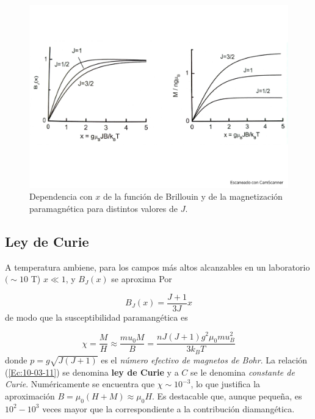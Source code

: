 \begin{figure}[h!] \centering
	\includegraphics[scale=0.35]{Cuerpo/Ch_10/Fotos libro 2.pdf}
	\caption{Dependencia con $x$ de la función de Brillouin y de la magnetización paramagnética para distintos valores de $J$.}
	\label{Fig:10-02}
\end{figure}

\subsection{Ley de Curie}

A temperatura ambiene, para los campos más altos alcanzables en un laboratorio $(\sim 10$ T) $x\ll 1$, y $B_J(x)$ se aproxima Por

\begin{equation}
	B_J (x) = \frac{J+1}{3J} x
\end{equation}
de modo que la susceptibilidad paramangética es 

\begin{equation}
	\chi = \frac{M}{H} \approx \frac{mu_0 M}{B} = \frac{nJ(J+1)g^2 \mu_0 mu_B^2}{3k_BT} \label{Ec:10-03-11}
\end{equation}
donde $p=g \sqrt{J(J+1)}$ es el \textit{número efectivo de magnetos de Bohr}. La relación (\ref{Ec:10-03-11}) se denomina \textbf{ley de Curie} y a $C$ se le denomina \textit{constante de Curie}. Numéricamente se encuentra que $\chi\sim 10^{-3}$, lo que justifica la aproximación $B=\mu_0 (H+M) \approx \mu_0 H$. Es destacable que, aunque pequeña, es $10^2-10^3$ veces mayor que la correspondiente a la contribución diamangética.



